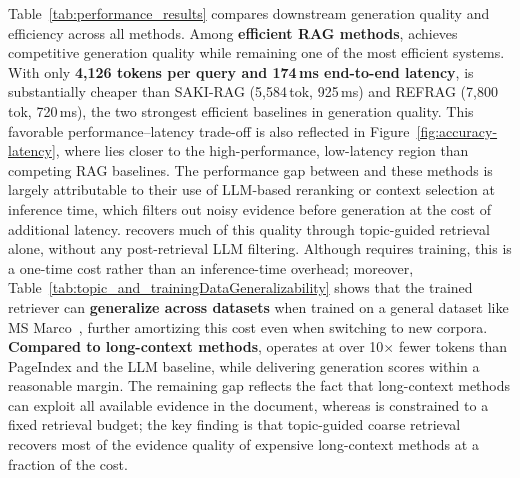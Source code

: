 Table~\ref{tab:performance_results} compares downstream generation quality and efficiency across all methods. Among \textbf{efficient RAG methods}, \name{} achieves competitive generation quality while remaining one of the most efficient systems. With only \textbf{4,126 tokens per query and 174\,ms end-to-end latency}, \name{} is substantially cheaper than SAKI-RAG (5,584\,tok, 925\,ms) and REFRAG (7,800\,tok, 720\,ms), the two strongest efficient baselines in generation quality. This favorable performance--latency trade-off is also reflected in Figure~\ref{fig:accuracy-latency}, where \name{} lies closer to the high-performance, low-latency region than competing RAG baselines. The performance gap between \name{} and these methods is largely attributable to their use of LLM-based reranking or context selection at inference time, which filters out noisy evidence before generation at the cost of additional latency. \name{} recovers much of this quality through topic-guided retrieval alone, without any post-retrieval LLM filtering. Although \name{} requires training, this is a one-time cost rather than an inference-time overhead; moreover, Table~\ref{tab:topic_and_trainingDataGeneralizability} shows that the trained retriever can \textbf{generalize across datasets} when trained on a general dataset like MS Marco~\cite{DBLP:journals/corr/NguyenRSGTMD16}, further amortizing this cost even when switching to new corpora. \textbf{Compared to long-context methods}, \name{} operates at over 10$\times$ fewer tokens than PageIndex and the LLM baseline, while delivering generation scores within a reasonable margin. The remaining gap reflects the fact that long-context methods can exploit all available evidence in the document, whereas \name{} is constrained to a fixed retrieval budget; the key finding is that topic-guided coarse retrieval recovers most of the evidence quality of expensive long-context methods at a fraction of the cost.